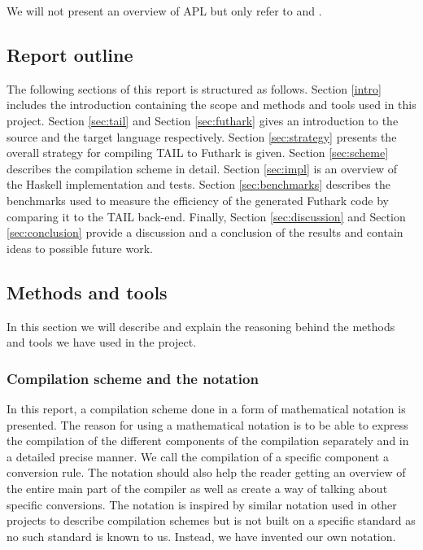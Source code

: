 \documentclass[11pt]{article}
\begin{document}
We will not present an overview of APL but only refer to \cite{APLbook} and \cite{APLDyalog}.

\subsection{Report outline}
The following sections of this report is structured as follows. 
Section \ref{intro} includes the introduction containing the scope and methods and tools used in this project. 
Section \ref{sec:tail} and Section \ref{sec:futhark} gives an introduction to the source and the target language respectively. 
Section \ref{sec:strategy} presents the overall strategy for compiling TAIL to Futhark is given.
Section \ref{sec:scheme} describes the compilation scheme in detail. Section \ref{sec:impl} is an overview of the Haskell implementation and tests. Section \ref{sec:benchmarks} describes the benchmarks used to measure the efficiency of the generated Futhark code by comparing it to the TAIL back-end.
Finally, Section \ref{sec:discussion} and Section \ref{sec:conclusion} provide a discussion and a conclusion of the results and contain ideas to possible future work. 

\subsection{Methods and tools}
\label{methods}
In this section we will describe and explain the reasoning behind the methods and tools we have used in the project. 

\subsubsection{Compilation scheme and the notation}
In this report, a compilation scheme done in a form of mathematical notation is presented. 
The reason for using a mathematical notation is to be able to express the compilation of the different components of the compilation separately and in a detailed precise manner. We call the compilation of a specific component a conversion rule. 
The notation should also help the reader getting an overview of the entire main part of the compiler as well as create a way of talking about specific conversions.
The notation is inspired by similar notation used in other projects \cite{TorbenMogensen}\cite{MartinElsmanNotation} to describe compilation schemes but is not built on a specific standard as no such standard is known to us.
Instead, we have invented our own notation.
\end{document}
